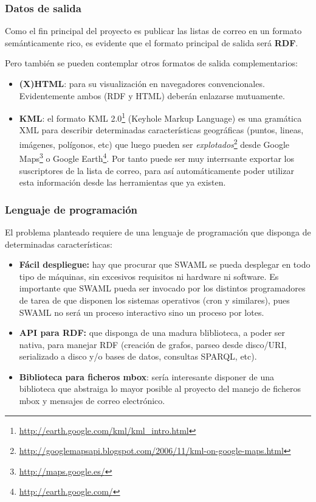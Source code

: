 \subsubsection{Datos de salida}

Como el fin principal del proyecto es publicar las listas de correo en un
formato semánticamente rico, es evidente que el formato principal de salida
será \textbf{RDF}.

Pero también se pueden contemplar otros formatos de salida complementarios:

\begin{itemize}
  \item \textbf{(X)HTML}: para su visualización en navegadores convencionales.
	Evidentemente ambos (RDF y HTML) deberán enlazarse mutuamente.
  \item \textbf{KML}: el formato KML 2.0\footnote{\url{http://earth.google.com/kml/kml_intro.html}}
	(Keyhole Markup Language) es una gramática XML para describir determinadas
	características geográficas (puntos, lineas, imágenes, polígonos, etc)
	que luego pueden ser 
	\emph{explotados}\footnote{\url{http://googlemapsapi.blogspot.com/2006/11/kml-on-google-maps.html}} 
	desde Google Maps\footnote{\url{http://maps.google.es/}} o
	Google Earth\footnote{\url{http://earth.google.com/}}. Por tanto
	puede ser muy interrsante exportar los suscriptores de la lista de
	correo, para así automáticamente poder utilizar esta información
	desde las herramientas que ya existen.
\end{itemize}

\subsubsection{Lenguaje de programación}

El problema planteado requiere de una lenguaje de programación que disponga
de determinadas características:

\begin{itemize}
  \item \textbf{Fácil despliegue:} hay que procurar que SWAML se pueda desplegar 
	en todo tipo de máquinas, sin excesivos requisitos ni hardware ni software.
	Es importante que SWAML pueda ser invocado por los distintos programadores
	de tarea de que disponen los sistemas operativos (cron y similares), pues
	SWAML no será un proceso interactivo sino un proceso por lotes.
  \item \textbf{API para RDF:} que disponga de una madura bliblioteca, a poder ser 
	nativa, para manejar RDF (creación de grafos, parseo desde disco/URI, 
	serializado a disco y/o bases de datos, consultas SPARQL, etc).
  \item \textbf{Biblioteca para ficheros mbox}: sería interesante disponer de una 
	biblioteca que abstraiga lo mayor posible al proyecto del manejo de ficheros
	mbox\cite{Hall2005} y mensajes de correo electrónico\cite{Resnick2001}.
\end{itemize}

